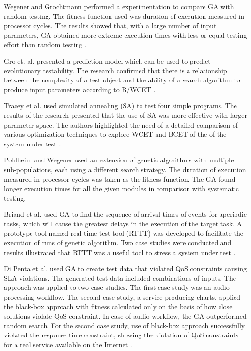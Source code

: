 \documentclass[conference]{IEEEtran}
\begin{document}
Wegener and Grochtmann performed a  experimentation
to compare GA with random testing. The fitness function used was duration of execution measured in processor cycles.  The results showed that, with a large number of input parameters, GA obtained more extreme execution times with less or equal testing effort than random testing \cite{J.WegenerK.GrimmM.GrochtmannH.Sthamer1996} \cite{Wegener1998} .

Gro et. al. presented a prediction model  which can be used to predict evolutionary testability. The research confirmed that there is a relationship between the complexity of a test object and the ability of a search algorithm to produce input parameters according to B/WCET \cite{Gross2000}. 

Tracey et al. used simulated annealing (SA) to test four
simple programs. The results of the research presented that the use of SA was more effective with larger parameter space. The authors highlighted the need of a detailed comparison of various optimization techniques to explore WCET and BCET of the of the system under test \cite{Tracey1998}.

Pohlheim and Wegener used an extension of genetic algorithms with multiple sub-populations, each using a different search strategy. The duration of execution measured in processor cycles was taken as the fitness
function. The GA found longer execution times for all the given modules in comparison with systematic testing\cite{Pohlheim2005}.

Briand et al. used GA to find the sequence of arrival times of events for aperiodic tasks, which will cause the greatest delays in the execution of the target task. A prototype tool named real-time test tool (RTTT) was developed to facilitate the execution of runs of genetic algorithm. Two case studies were conducted and results illustrated that RTTT was a useful tool to stress a system under test \cite{Briand2005}.

Di Penta et al. used GA to create test data that violated QoS constraints causing SLA violations. The generated test data included combinations of inputs. The approach was applied to two case studies. The first case study was an audio processing workflow. The second case study, a service producing charts, applied the black-box approach with fitness calculated only on the basis of how close solutions violate QoS constraint. In case of audio workflow, the GA outperformed random search. For the second case study, use of black-box approach successfully violated the response time constraint, showing the violation of QoS constraints for a real service available on the Internet \cite{Penta2007}.
\end{document}
